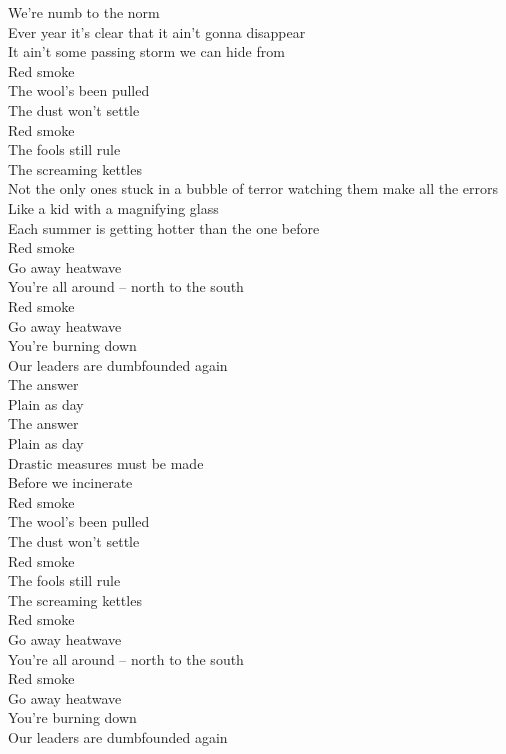 We're numb to the norm\\
Ever year it's clear that it ain't gonna disappear\\
It ain't some passing storm we can hide from\\

Red smoke\\
The wool's been pulled\\
The dust won't settle\\
Red smoke\\
The fools still rule\\
The screaming kettles\\

Not the only ones stuck in a bubble of terror watching them make all the errors\\
Like a kid with a magnifying glass\\
Each summer is getting hotter than the one before\\

Red smoke\\
Go away heatwave\\
You're all around -- north to the south\\
Red smoke\\
Go away heatwave\\
You're burning down\\
Our leaders are dumbfounded again\\

The answer\\
Plain as day\\
The answer\\
Plain as day\\
Drastic measures must be made\\
Before we incinerate\\

Red smoke\\
The wool's been pulled\\
The dust won't settle\\
Red smoke\\
The fools still rule\\
The screaming kettles\\
Red smoke\\
Go away heatwave\\
You're all around -- north to the south\\
Red smoke\\
Go away heatwave\\
You're burning down\\
Our leaders are dumbfounded again\\

